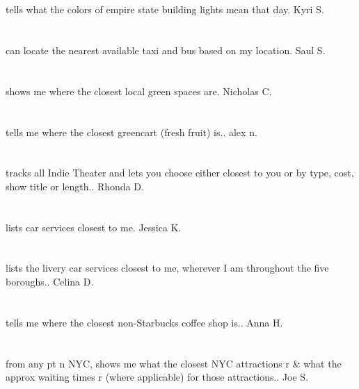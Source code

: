 \section{}tells what the colors of empire state building lights mean that day. Kyri S.
\section{}can locate the nearest available taxi and bus based on my location.  Saul S.
\section{}shows me where the closest local green spaces are. Nicholas C.
\section{}tells me where the closest greencart (fresh fruit) is.. alex n.
\section{}tracks all Indie Theater and lets you choose either closest to you or by type,  cost,  show title or length.. Rhonda D.
\section{} lists car services closest to me. Jessica K.
\section{} lists the livery car services closest to me,  wherever I am throughout the five boroughs.. Celina D.
\section{} tells me where the closest non-Starbucks coffee shop is.. Anna H.
\section{}from any pt n NYC,  shows me what the closest NYC attractions r \& what the approx waiting times r (where applicable) for those attractions.. Joe S.
